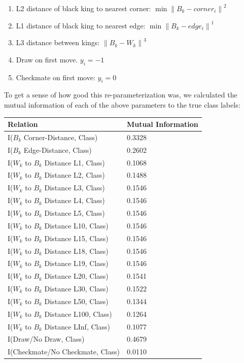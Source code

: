 \documentclass[fleqn]{article}
\begin{document}
\begin{enumerate}
\item L2 distance of black king to nearest corner: $\min \left\|B_k-corner_i\right\|^2$
\item L1 distance of black king to nearest edge: $\min \left\|B_k - edge_i\right\|^1$
\item L3 distance between kings: $\left\|B_k - W_k\right\|^3$
\item Draw on first move. $y_i = -1$
\item Checkmate on first move: $y_i = 0$
\end{enumerate}

To get a sense of how good this re-parameterization was, we calculated the mutual information of each of the above parameters to the true class labels:

\hspace{2.25cm}
\begin{tabular}{|l | l|}
\hline
\textbf{Relation} & \textbf{Mutual Information} \\ \hline
I($B_k$ Corner-Distance, Class) & 0.3328 \\ \hline
I($B_k$ Edge-Distance, Class) & 0.2602 \\ \hline
I($W_k$ to $B_k$ Distance L1, Class) & 0.1068 \\ \hline
I($W_k$ to $B_k$ Distance L2, Class) & 0.1488 \\ \hline
I($W_k$ to $B_k$ Distance L3, Class) & 0.1546 \\ \hline
I($W_k$ to $B_k$ Distance L4, Class) & 0.1546 \\ \hline
I($W_k$ to $B_k$ Distance L5, Class) & 0.1546 \\ \hline
I($W_k$ to $B_k$ Distance L10, Class) & 0.1546 \\ \hline
I($W_k$ to $B_k$ Distance L15, Class) & 0.1546 \\ \hline
I($W_k$ to $B_k$ Distance L18, Class) & 0.1546 \\ \hline
I($W_k$ to $B_k$ Distance L19, Class) & 0.1546 \\ \hline
I($W_k$ to $B_k$ Distance L20, Class) & 0.1541 \\ \hline
I($W_k$ to $B_k$ Distance L30, Class) & 0.1522 \\ \hline
I($W_k$ to $B_k$ Distance L50, Class) & 0.1344 \\ \hline
I($W_k$ to $B_k$ Distance L100, Class) & 0.1264 \\ \hline
I($W_k$ to $B_k$ Distance LInf, Class) & 0.1077 \\ \hline
I(Draw/No Draw, Class) & 0.4679 \\ \hline
I(Checkmate/No Checkmate, Class) & 0.0110 \\ \hline
\end{tabular}
\end{document}
